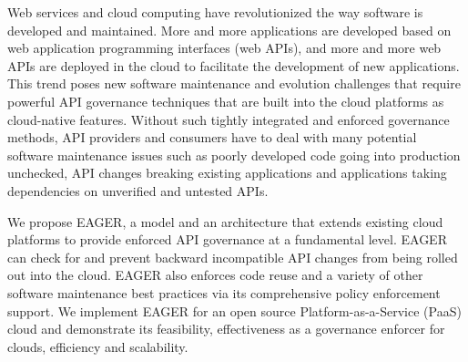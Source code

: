 Web services and cloud computing have
revolutionized the way software is developed and maintained. More and
more applications are developed based on web application programming interfaces 
(web APIs), and more and more web APIs are deployed in the cloud to facilitate the 
development of new applications. This trend poses new software maintenance and
evolution challenges that require powerful API governance techniques that are
built into the cloud platforms as cloud-native features. Without such tightly integrated 
and enforced governance methods, API providers and consumers have to deal with
many potential software maintenance issues such as poorly developed
code going into production unchecked, API changes breaking existing 
applications and applications taking dependencies on unverified and untested APIs.

We propose EAGER, a model and an architecture that extends existing cloud platforms
to provide enforced API governance at a fundamental level. EAGER can check for and
prevent backward incompatible API changes from being rolled out into the cloud. EAGER
also enforces code reuse and a variety of other software maintenance best practices
via its comprehensive policy enforcement support. We implement EAGER for an open source
Platform-as-a-Service (PaaS) cloud and demonstrate its feasibility, effectiveness as a
governance enforcer for clouds, efficiency and scalability.